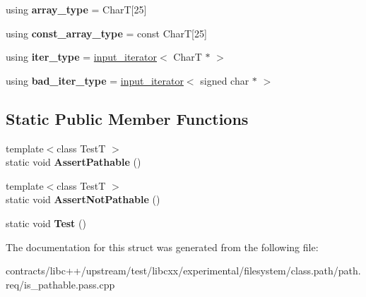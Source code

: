 \begin{DoxyCompactItemize}
\item 
\mbox{\label{struct_make_test_type_a1c17c9dccec671ddfa2a7e60b5154044}} 
using {\bfseries array\+\_\+type} = CharT\mbox{[}25\mbox{]}
\item 
\mbox{\label{struct_make_test_type_ac5b1067a6e6a2e259bca994994ff8b2d}} 
using {\bfseries const\+\_\+array\+\_\+type} = const CharT\mbox{[}25\mbox{]}
\item 
\mbox{\label{struct_make_test_type_a4ca09b04b443e981ae1912af6cbbd83e}} 
using {\bfseries iter\+\_\+type} = \mbox{\hyperlink{classinput__iterator}{input\+\_\+iterator}}$<$ CharT $\ast$ $>$
\item 
\mbox{\label{struct_make_test_type_ab24b4b74262b367afb7feabd45a92be5}} 
using {\bfseries bad\+\_\+iter\+\_\+type} = \mbox{\hyperlink{classinput__iterator}{input\+\_\+iterator}}$<$ signed char $\ast$ $>$
\end{DoxyCompactItemize}
\subsection*{Static Public Member Functions}
\begin{DoxyCompactItemize}
\item 
\mbox{\label{struct_make_test_type_a86bdfbabec1f5c8d6b4acde25414c666}} 
{\footnotesize template$<$class TestT $>$ }\\static void {\bfseries Assert\+Pathable} ()
\item 
\mbox{\label{struct_make_test_type_a91f1a36ad6e03402808289eea2ecb4e9}} 
{\footnotesize template$<$class TestT $>$ }\\static void {\bfseries Assert\+Not\+Pathable} ()
\item 
\mbox{\label{struct_make_test_type_ac28de384f86c34947d2ce456da750b52}} 
static void {\bfseries Test} ()
\end{DoxyCompactItemize}


The documentation for this struct was generated from the following file\+:\begin{DoxyCompactItemize}
\item 
contracts/libc++/upstream/test/libcxx/experimental/filesystem/class.\+path/path.\+req/is\+\_\+pathable.\+pass.\+cpp\end{DoxyCompactItemize}
